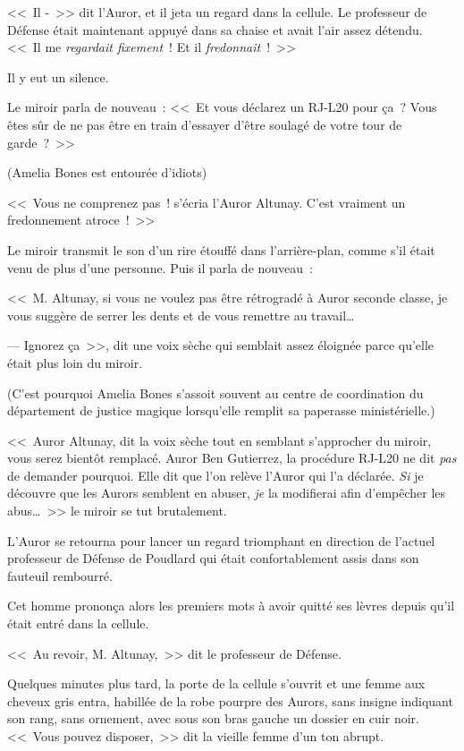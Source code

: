 <<~Il -~>> dit l'Auror, et il jeta un regard dans la cellule. Le professeur de Défense était maintenant appuyé dans sa chaise et avait l'air assez détendu. <<~Il me \emph{regardait fixement}~! Et il \emph{fredonnait}~!~>>

Il y eut un silence.

Le miroir parla de nouveau~: <<~Et vous déclarez un RJ-L20 pour ça~? Vous êtes sûr de ne pas être en train d'essayer d'être soulagé de votre tour de garde~?~>>

(Amelia Bones est entourée d'idiots)

<<~Vous ne comprenez pas~! s'écria l'Auror Altunay. C'est vraiment un fredonnement atroce~!~>>

Le miroir transmit le son d'un rire étouffé dans l'arrière-plan, comme s'il était venu de plus d'une personne. Puis il parla de nouveau~:

<<~M. Altunay, si vous ne voulez pas être rétrogradé à Auror seconde classe, je vous suggère de serrer les dents et de vous remettre au travail…

--- Ignorez ça~>>, dit une voix sèche qui semblait assez éloignée parce qu'elle était plus loin du miroir.

(C'est pourquoi Amelia Bones s'assoit souvent au centre de coordination du département de justice magique lorsqu'elle remplit sa paperasse ministérielle.)

<<~Auror Altunay, dit la voix sèche tout en semblant s'approcher du miroir, vous serez bientôt remplacé. Auror Ben Gutierrez, la procédure RJ-L20 ne dit \emph{pas} de demander pourquoi. Elle dit que l'on relève l'Auror qui l'a déclarée. \emph{Si} je découvre que les Aurors semblent en abuser, \emph{je} la modifierai afin d'empêcher les abus…~>> le miroir se tut brutalement.

L'Auror se retourna pour lancer un regard triomphant en direction de l'actuel professeur de Défense de Poudlard qui était confortablement assis dans son fauteuil rembourré.

Cet homme prononça alors les premiers mots à avoir quitté ses lèvres depuis qu'il était entré dans la cellule.

<<~Au revoir, M. Altunay,~>> dit le professeur de Défense.

Quelques minutes plus tard, la porte de la cellule s'ouvrit et une femme aux cheveux gris entra, habillée de la robe pourpre des Aurors, sans insigne indiquant son rang, sans ornement, avec sous son bras gauche un dossier en cuir noir. <<~Vous pouvez disposer,~>> dit la vieille femme d'un ton abrupt.


